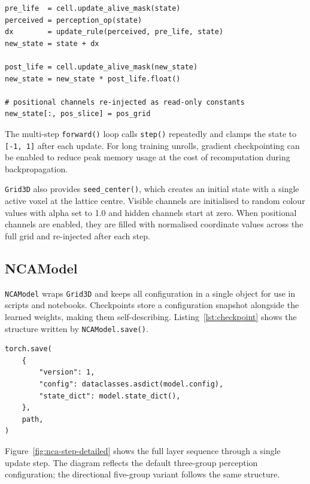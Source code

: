 \begin{lstlisting}[style=py, caption={Single NCA update step (pseudocode).},
label={lst:grid-step}]
pre_life  = cell.update_alive_mask(state)
perceived = perception_op(state)
dx        = update_rule(perceived, pre_life, state)
new_state = state + dx

post_life = cell.update_alive_mask(new_state)
new_state = new_state * post_life.float()

# positional channels re-injected as read-only constants
new_state[:, pos_slice] = pos_grid
\end{lstlisting}

The multi-step \texttt{forward()} loop calls \texttt{step()} repeatedly and
clamps the state to \texttt{[-1,\,1]} after each update. For long training
unrolls, gradient checkpointing can be enabled to reduce peak memory usage at
the cost of recomputation during backpropagation.

\texttt{Grid3D} also provides \texttt{seed\_center()}, which creates an
initial state with a single active voxel at the lattice centre. Visible
channels are initialised to random colour values with alpha set to 1.0 and
hidden channels start at zero. When positional channels are enabled, they are
filled with normalised coordinate values across the full grid and re-injected
after each step.

\clearpage

\subsection{NCAModel}

\texttt{NCAModel} wraps \texttt{Grid3D} and keeps all configuration in a
single object for use in scripts and notebooks. Checkpoints store a
configuration snapshot alongside the learned weights, making them
self-describing. Listing~\ref{lst:checkpoint} shows the structure written by
\texttt{NCAModel.save()}.

\begin{lstlisting}[style=py, caption={Checkpoint structure written by
\texttt{NCAModel.save()}.}, label={lst:checkpoint}]
torch.save(
    {
        "version": 1,
        "config": dataclasses.asdict(model.config),
        "state_dict": model.state_dict(),
    },
    path,
)
\end{lstlisting}

Figure~\ref{fig:nca-step-detailed} shows the full layer sequence through a
single update step. The diagram reflects the default three-group perception
configuration; the directional five-group variant follows the same structure.

